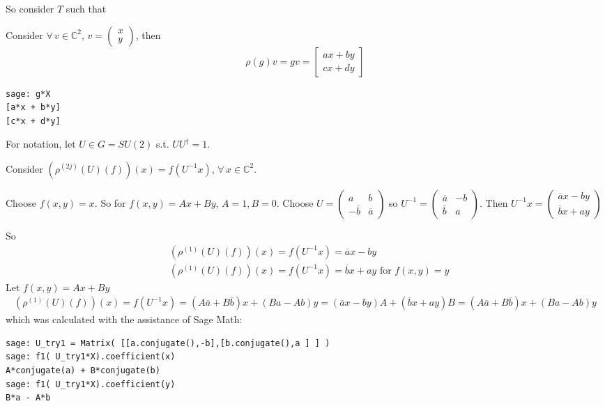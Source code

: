 \documentclass[10pt]{amsart}
\begin{document}
\begin{multicols*}{2}
So consider $T$ such that 


Consider $\forall \, v \in \mathbb{C}^2$, $v =\left( \begin{matrix} x \\ y \end{matrix} \right)$, then 
\[
\rho(g)v = gv = \left[ \begin{matrix} ax + by \\ cx + dy \end{matrix} \right]
\]

\begin{lstlisting}
sage: g*X
[a*x + b*y]
[c*x + d*y]
\end{lstlisting}

For notation, let $U \in G = SU(2)$ s.t. $UU^{\dag}=1$.  

Consider $(\rho^{(2j)}(U)(f))(x) = f(U^{-1}x)$, $\forall \, x \in \mathbb{C}^2$.  

Choose $f(x,y) = x$.  So for $f(x,y) = Ax+By$, $A=1,B=0$.  Choose $U = \left( \begin{matrix} a & b \\
-\overline{b} & \overline{a} \end{matrix} \right)$ so $U^{-1} = \left( \begin{matrix} \overline{a} & -b \\
\overline{b} & a \end{matrix} \right)$.  Then $U^{-1}x = \left( \begin{matrix} \overline{a}x - by \\
\overline{b}x + ay \end{matrix} \right)$

So 
\[
\begin{aligned}
& (\rho^{(1)}(U)(f) )(x) = f(U^{-1}x) = \overline{a}x - by \\ 
& (\rho^{(1)}(U)(f))(x) = f(U^{-1}x) = \overline{b}x + ay \text{ for } f(x,y) = y 
\end{aligned}
\]
Let $f(x,y) = Ax + By$
\[
\begin{gathered}
(\rho^{(1)}(U)(f))(x) = f(U^{-1}x) = (A\overline{a}+B\overline{b})x + (Ba - Ab)y = (\overline{a}x - by)A + (\overline{b}x + ay)B  = (A\overline{a} + B\overline{b})x + (Ba-Ab)y
\end{gathered}
\]
which was calculated with the assistance of Sage Math:
\begin{lstlisting}
sage: U_try1 = Matrix( [[a.conjugate(),-b],[b.conjugate(),a ] ] )
sage: f1( U_try1*X).coefficient(x)
A*conjugate(a) + B*conjugate(b)
sage: f1( U_try1*X).coefficient(y)
B*a - A*b
\end{lstlisting}


\end{multicols*}
\end{document}
